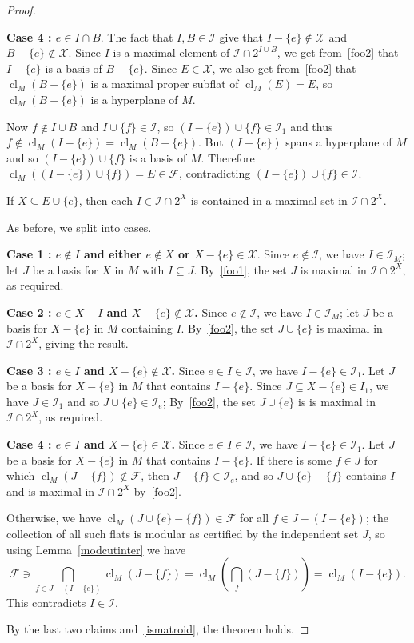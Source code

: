 \documentclass[10pt,a4paper]{amsart}
\newcommand{\br}[1]{\left(#1\right)}
\newcommand{\cF}{\mathcal{F}}
\newcommand{\cI}{\mathcal{I}}
\newcommand{\cX}{\mathcal{X}}
\DeclareMathOperator{\cl}{cl}
\renewcommand{\ss}{\subseteq}
\begin{document}
\begin{proof}
\begin{subproof}
    \textbf{Case 4 : $e \in I \cap B$}. 
    The fact that $I,B \in \cI$ give that $I - \{e\} \notin \cX$ and $B - \{e\} \notin \cX$. 
    Since $I$ is a maximal element of $\cI \cap 2^{I \cup B}$, we get from~\ref{foo2} that 
    $I - \{e\}$ is a basis of $B - \{e\}$. Since $E \in \cX$, we also get from~\ref{foo2}
    that $\cl_M(B - \{e\})$ is a maximal proper subflat of $\cl_M(E) = E$, so 
    $\cl_M(B - \{e\})$ is a hyperplane of $M$.

    Now $f \notin I \cup B$ and $I \cup \{f\} \in \cI$, so $(I - \{e\}) \cup \{f\} \in \cI_1$
    and thus $f \notin \cl_M(I  - \{e\}) = \cl_M(B - \{e\})$. But $(I - \{e\})$ spans
    a hyperplane of $M$ and so $(I - \{e\}) \cup \{f\}$ is a basis of $M$. 
    Therefore $\cl_M((I - \{e\}) \cup \{f\}) = E \in \cF$, 
    contradicting $(I - \{e\}) \cup \{f\} \in \cI$. 
  \end{subproof}
  
  \begin{claim}
    If $X \ss E \cup \{e\}$, then each $I \in \cI \cap 2^X$ is contained in a maximal set in $\cI \cap 2^X$. 
  \end{claim}
  \begin{subproof}
    As before, we split into cases. 

    \textbf{Case 1 : $e \notin I$ and either $e \notin X$ or $X - \{e\} \in \cX$}.
    Since $e \notin \cI$, we have $I \in \cI_M$; let $J$ be a basis for $X$ in $M$ with $I \ss J$. 
    By~\ref{foo1}, the set $J$ is maximal in $\cI \cap 2^X$, as required. 

    \textbf{Case 2 : $e \in X - I$ and $X - \{e\} \notin \cX$.}
    Since $e \notin \cI$, we have $I \in \cI_M$; 
    let $J$ be a basis for $X - \{e\}$ in $M$ containing $I$. By~\ref{foo2}, the set $J \cup \{e\}$ 
    is maximal in $\cI \cap 2^X$, giving the result. 

    \textbf{Case 3 : $e \in I$ and $X - \{e\} \notin \cX$.}
    Since $e \in I \in \cI$, we have $I - \{e\} \in \cI_1$. Let $J$ be a basis for $X - \{e\}$ 
    in $M$ that contains $I - \{e\}$. 
    Since $J \ss X - \{e\} \in I_1$, we have $J \in \cI_1$ and so $J \cup \{e\} \in \cI_e$;
    By~\ref{foo2}, the set $J \cup \{e\}$ is 
    is maximal in $\cI \cap 2^X$, as required. 

    \textbf{Case 4 : $e \in I$ and $X - \{e\} \in \cX$.}
    Since $e \in I \in \cI$, we have $I - \{e\} \in \cI_1$. Let $J$ be a basis for $X - \{e\}$ 
    in $M$ that contains $I - \{e\}$. If there is some $f \in J$ for which 
    $\cl_M(J - \{f\}) \notin \cF$, then $J - \{f\} \in \cI_e$, 
    and so $J \cup \{e\}  - \{f\}$ contains $I$ and  is maximal in $\cI \cap 2^X$ by~\ref{foo2}. 

    Otherwise, we have $\cl_M(J \cup \{e\} - \{f\}) \in \cF$ for all $f \in J - (I - \{e\})$; 
    the collection of all such flats is modular as certified by the independent set $J$, 
    so using Lemma~\ref{modcutinter} we have
    \[\cF \ni \bigcap_{f \in J - (I - \{e\})} \cl_M(J - \{f\}) = \cl_M\br{\bigcap_f (J - \{f\})} = \cl_M(I - \{e\}).\]
    This contradicts $I \in \cI$. 
  \end{subproof}
  By the last two claims and~\ref{ismatroid}, the theorem holds. 
\end{proof}
\end{document}
